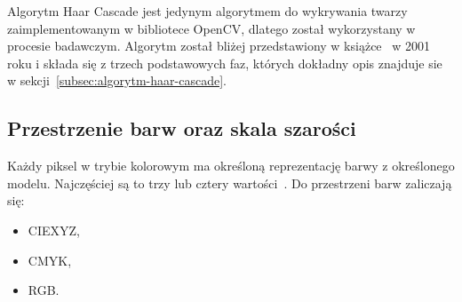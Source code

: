 \documentclass[a4paper,twoside,12pt]{book}
\begin{document}
    Algorytm Haar Cascade jest jedynym algorytmem do wykrywania twarzy zaimplementowanym w bibliotece OpenCV,
    dlatego został wykorzystany w procesie badawczym.
    Algorytm został bliżej przedstawiony w książce~\cite{violaJones} w 2001 roku i składa się z trzech podstawowych faz,
    których dokładny opis znajduje sie w sekcji~\ref{subsec:algorytm-haar-cascade}.


    \subsection{Przestrzenie barw oraz skala szarości}\label{subsec:konwersja-do-skali-szarości-oraz-przestrzenie-barw}
    Każdy piksel w trybie kolorowym ma określoną reprezentację barwy z określonego modelu.
    Najczęściej są to trzy lub cztery
    wartości~\cite{przestrzenieKolorow}.
    Do przestrzeni barw zaliczają się:
    \begin{itemize}
        \item CIEXYZ,
        \item CMYK,
        \item RGB.
    \end{itemize}
\end{document}
